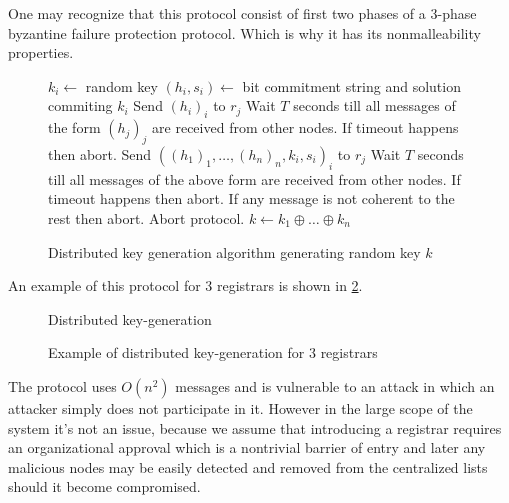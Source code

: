 One may recognize that this protocol consist of first two phases of a 3-phase
byzantine failure protection protocol. Which is why it has its nonmalleability
properties.

\begin{figure}
  \begin{algorithmic}[1]
  \STATE $k_i \leftarrow $ random key
  \STATE $(h_i, s_i) \leftarrow $ bit commitment string and solution commiting
  $k_i$
    \STATE Send $(h_i)_{i}$ to $r_j$
  \ENDFOR
  \STATE Wait $T$ seconds till all messages of the form $(h_j)_j$ are received
  from other nodes. If timeout happens then abort.
    \STATE Send $\left( (h_1)_1, \ldots, (h_n)_{n}, k_i, s_i\right)_i$ to $r_j$
  \ENDFOR
  \STATE Wait $T$ seconds till all messages of the above form are received
  from other nodes. If timeout happens then abort. If any message is not
  coherent to the rest then abort.
      \STATE Abort protocol.
    \ENDIF
  \ENDFOR
  \STATE $k \leftarrow k_1 \oplus \ldots \oplus k_n$
\end{algorithmic}
  \caption{Distributed key generation algorithm generating random key $k$}
  \label{fig:key_gen_alg}
\end{figure}

An example of this protocol for 3 registrars is shown in
\ref{fig:key_gen_example}.

\begin{figure}
\begin{msc}{Distributed key-generation}
\setlength{\instdist}{5.5cm}
\setlength{\envinstdist}{3cm}
\nextlevel[5]
\nextlevel[2]
\nextlevel[2]
\nextlevel[2]
\nextlevel[2]
\nextlevel[2]
\end{msc}
\label{fig:key_gen_example}
\caption{Example of distributed key-generation for 3 registrars}
\end{figure}

The protocol uses $O\left(n^2\right)$ messages and is vulnerable to an attack in
which an attacker simply does not participate in it. However in the large scope
of the system it's not an issue, because we assume that introducing a registrar
requires an organizational approval which is a nontrivial barrier of entry and
later any malicious nodes may be easily detected and removed from the
centralized lists should it become compromised.

